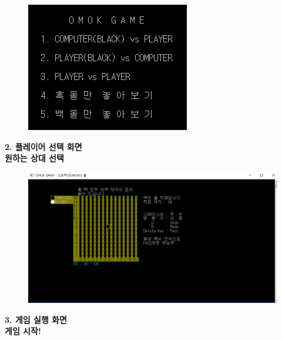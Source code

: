 \documentclass[a4paper, 11pt]{article}
\begin{document}
\begin{figure}[h] %
	\begin{center}
		\includegraphics[width=0.5\linewidth]{second.png}
	\end{center}
	\label{fig:long}
	\label{fig:onecol}
\end{figure}
\begin{center}
	\textbf{{\Large 2. 플레이어 선택 화면\\}}
	\textbf{{\normalsize 원하는 상대 선택 \\}}
\end{center}

	\newpage
\begin{figure}[h] %
	\begin{center}
		\includegraphics[width=0.8\linewidth]{third.png}
	\end{center}
	\label{fig:long}
	\label{fig:onecol}
\end{figure}
\begin{center}
	\textbf{{\Large 3. 게임 실행 화면\\}}
	\textbf{{\normalsize 게임 시작! \\}}
	\vspace{0.5cm}
\end{center}
\end{document}

